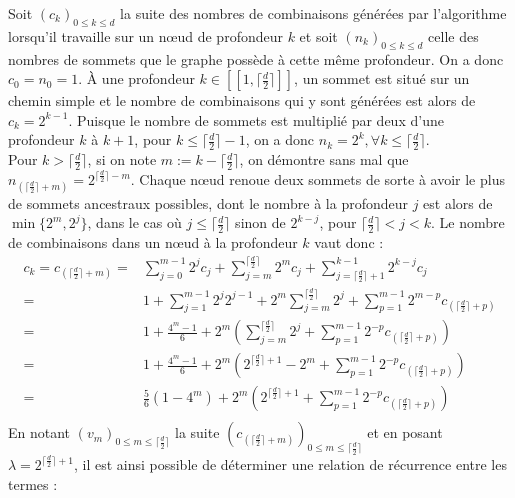 \documentclass[12pt, twoside]{report}
\begin{document}
Soit $(c_k)_{0\leq k \leq d}$ la suite des nombres de combinaisons générées par l'algorithme lorsqu'il travaille sur un n\oe{}ud de profondeur $k$ et soit $(n_k)_{0\leq k \leq d}$ celle des nombres de sommets que le graphe possède à cette même profondeur. On a donc $c_0 = n_0 = 1$. À une profondeur $k \in [\![1,\lceil \frac{d}{2}\rceil]\!]$, un sommet est situé sur un chemin simple et le nombre de combinaisons qui y sont générées est alors de $c_k = 2^{k-1}$. Puisque le nombre de sommets est multiplié par deux d'une profondeur $k$ à $k+1$, pour $k \leq \lceil \frac{d}{2}\rceil -1$, on a donc $n_k=2^k, \forall k\leq \lceil \frac{d}{2} \rceil$.\\
Pour $k > \lceil \frac{d}{2} \rceil $, si on note $m:=k-\lceil \frac{d}{2} \rceil$, on démontre sans mal que $n_{(\lceil \frac{d}{2} \rceil + m)} = 2^{\lceil \frac{d}{2}\rceil - m}$. Chaque n\oe{}ud renoue deux sommets de sorte à avoir le plus de sommets ancestraux possibles, dont le nombre à la profondeur $j$ est alors de $\min\{2^{m}, 2^{j}\}$, dans le cas où $j\leq \lceil \frac{d}{2} \rceil$ sinon de $2^{k-j}$, pour $\lceil \frac{d}{2} \rceil < j <k$.
Le nombre de combinaisons dans un n\oe{}ud à la profondeur $k$ vaut donc :
\begin{equation}
    \begin{split}
        c_k = c_{(\lceil \frac{d}{2} \rceil + m)} = & \sum_{j=0}^{m-1} 2^j c_j + \sum_{j=m}^{\lceil \frac{d}{2} \rceil} 2^m c_j + \sum_{j=\lceil \frac{d}{2} \rceil+1}^{k-1}2^{k-j}c_j \\
        = & 1 + \sum_{j=1}^{m-1} 2^j 2^{j-1} + 2^m\sum_{j=m}^{\lceil \frac{d}{2} \rceil} 2^j + \sum_{p=1}^{m-1} 2^{m-p}c_{(\lceil \frac{d}{2} \rceil + p)}\\
        = & 1 + \frac{4^m - 1}{6} + 2^m\left(\sum_{j=m}^{\lceil \frac{d}{2} \rceil} 2^j + \sum_{p=1}^{m-1} 2^{-p}c_{(\lceil \frac{d}{2} \rceil + p)}\right)\\
        = & 1 + \frac{4^m - 1}{6} + 2^m\left(2^{\lceil \frac{d}{2} \rceil+1} - 2^m + \sum_{p=1}^{m-1} 2^{-p}c_{(\lceil \frac{d}{2} \rceil + p)}\right)\\
        = & \frac{5}{6}(1-4^m) + 2^m\left(2^{\lceil \frac{d}{2} \rceil+1} + \sum_{p=1}^{m-1} 2^{-p}c_{(\lceil \frac{d}{2} \rceil + p)}\right)\\
    \end{split}
\end{equation}
En notant $(v_m)_{0\leq m \leq \lceil \frac{d}{2} \rceil}$ la suite $(c_{(\lceil \frac{d}{2} \rceil+m)})_{0\leq m \leq \lceil \frac{d}{2} \rceil}$ et en posant $\lambda = 2^{\lceil \frac{d}{2} \rceil + 1}$, il est ainsi possible de déterminer une relation de récurrence entre les termes :
\end{document}
